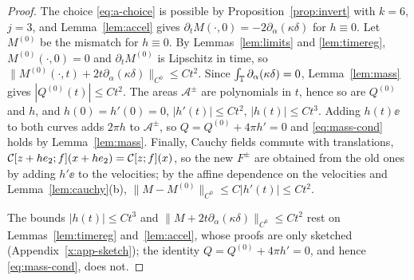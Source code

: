 \begin{proof}
The choice \eqref{eq:a-choice} is possible by Proposition~\ref{prop:invert} with $k=6$, $j=3$, and Lemma~\ref{lem:accel} gives $\partial_tM(\cdot,0)=-2\partial_\alpha(\kappa\delta)$ for $h\equiv0$. Let $M^{(0)}$ be the mismatch
for $h\equiv0$. By Lemmas~\ref{lem:limits} and \ref{lem:timereg}, $M^{(0)}(\cdot,0)=0$ and $\partial_tM^{(0)}$ is Lipschitz in time, so $\|M^{(0)}(\cdot,t)+2t\partial_\alpha(\kappa\delta)\|_{C^0}\le Ct^2$. Since
$\int_{\mathbb{T}}\partial_\alpha(\kappa\delta)=0$, Lemma~\ref{lem:mass} gives $|Q^{(0)}(t)|\le Ct^2$. The areas $\mathcal A^\pm$ are polynomials in $t$, hence so are $Q^{(0)}$ and $h$, and $h(0)=h'(0)=0$,
$|h'(t)|\le Ct^2$, $|h(t)|\le Ct^3$. Adding $h(t)\ee$ to both curves adds $2\pi h$ to $\mathcal A^\pm$, so $Q=Q^{(0)}+4\pi h'=0$ and \eqref{eq:mass-cond} holds by Lemma~\ref{lem:mass}. Finally, Cauchy
fields commute with translations, $\mathcal{C}[z+he_2;f](x+he_2)=\mathcal{C}[z;f](x)$, so the new $F^\pm$ are obtained from the old ones by adding $h'\ee$ to the velocities; by the affine dependence on the velocities and
Lemma~\ref{lem:cauchy}(b), $\|M-M^{(0)}\|_{C^0}\le C|h'(t)|\le Ct^2$.

The bounds $|h(t)|\le Ct^3$ and $\|M+2t\partial_\alpha(\kappa\delta)\|_{C^0}\le Ct^2$ rest on Lemmas~\ref{lem:timereg} and~\ref{lem:accel}, whose proofs are only sketched
(Appendix~\ref{x:app-sketch}); the identity $Q=Q^{(0)}+4\pi h'=0$, and hence \eqref{eq:mass-cond}, does not.
\end{proof}

